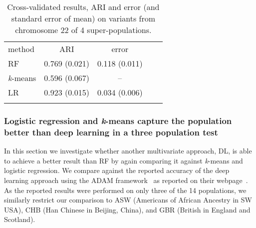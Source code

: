 \documentclass{llncs}
\newcommand{\kMeans}{\textit{k}-means }
\begin{document}
{\begin{table}
\caption{Cross-validated results, ARI and error (and standard error of mean) on variants from chromosome 22 of 4 super-populations.}
\begin{center}
\renewcommand{\arraystretch}{1.4}
\setlength\tabcolsep{3pt}
\begin{tabular}{lcccc}
\hline\noalign{\smallskip}
method  & ARI & error \\
RF  & 0.769 (0.021) &0.118 (0.011) \\
\kMeans & 0.596 (0.067) & -- \\
LR & 0.923 (0.015) & 0.034 (0.006) \\
\noalign{\smallskip}
\hline
\label{RF}
\end{tabular}
\end{center}
\end{table}


\subsubsection{Logistic regression and \kMeans{} capture the population better than deep learning in a three population test}
In this section we investigate whether another multivariate approach, DL, is able to achieve a better result than
RF by again comparing it against \kMeans{} and logistic regression.  We compare against the reported accuracy of the
deep learning approach using the {\sc ADAM} framework~\cite{Massie2013} as reported on their webpage~\cite{Ferguson}.
As the reported results were performed on only three of the 14 populations, we similarly restrict our comparison to ASW
(Americans of African Ancestry in SW USA), CHB (Han Chinese in Beijing, China), and GBR (British in England and
Scotland).

}
\end{document}
